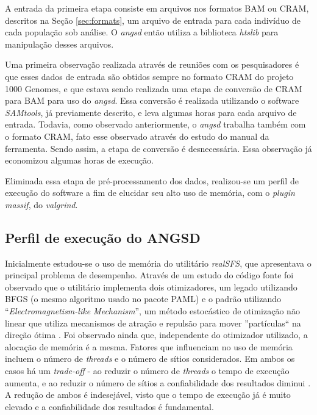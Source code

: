 \documentclass[cic,tc]{iiufrgs}
\begin{document}
A entrada da primeira etapa consiste em arquivos nos formatos BAM ou CRAM,
descritos na Seção \ref{sec:formats}, um arquivo de entrada para cada indivíduo
de cada população sob análise. O \textit{angsd} então utiliza a biblioteca
\textit{htslib} para manipulação desses arquivos.

Uma primeira observação realizada através de reuniões com os pesquisadores é
que esses dados de entrada são obtidos sempre no formato CRAM do projeto 1000
Genomes, e que estava sendo realizada uma etapa de conversão de CRAM para BAM
para uso do \textit{angsd}. Essa conversão é realizada utilizando o software
\textit{SAMtools}, já previamente descrito, e leva algumas horas para cada arquivo de
entrada. Todavia, como observado anteriormente, o \textit{angsd} trabalha também com o
formato CRAM, fato esse observado através do estudo do manual da ferramenta.
Sendo assim, a etapa de conversão é desnecessária. Essa observação já
economizou algumas horas de execução.

Eliminada essa etapa de pré-processamento dos dados, realizou-se um perfil de
execução do software a fim de elucidar seu alto uso de memória, com o
\textit{plugin} \textit{massif}, do \textit{valgrind}.

\subsection{Perfil de execução do ANGSD}

Inicialmente estudou-se o uso de memória do utilitário \textit{realSFS}, que apresentava o
principal problema de desempenho. Através de um estudo do código fonte foi
observado que o utilitário implementa dois otimizadores, um legado utilizando
BFGS (o mesmo algoritmo usado no pacote PAML) e o padrão utilizando
``\textit{Electromagnetism-like Mechanism}'', um método estocástico de otimização
não linear que utiliza mecanismos de atração e repulsão para mover
''partículas`` na direção ótima \cite{5636954}. Foi observado ainda que,
independente do otimizador utilizado, a alocação de memória é a mesma. Fatores
que influenciam no uso de memória incluem o número de \textit{threads} e o número de
sítios considerados. Em ambos os casos há um \textit{trade-off} - ao reduzir o
número de \textit{threads} o tempo de execução aumenta, e ao reduzir o número de sítios
a confiabilidade dos resultados diminui \cite{popgen2016angsd}. A redução de
ambos é indesejável, visto que o tempo de execução já é muito elevado e a
confiabilidade dos resultados é fundamental.
\end{document}
